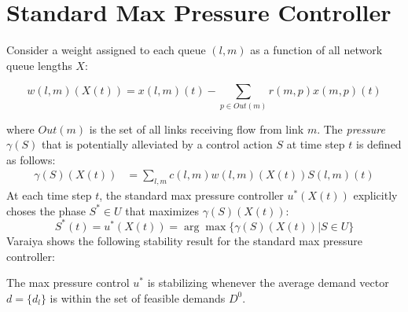 \section{Standard Max Pressure Controller} \label{sec:immediatefeedback}
Consider a weight assigned to each queue $(l,m)$ as a function of all network queue lengths $X$:
\begin{small}
\begin{equation} \label{linkweight}
w(l,m)(X(t))= x(l,m)(t) - \sum_{p \in Out(m)} r(m,p)x(m,p)(t)
\end{equation}
\end{small}
where $Out(m)$ is the set of all links receiving flow from link $m$. 
The \emph{pressure} $\gamma(S)$ that is potentially alleviated by a control action $S$ at time step $t$ is defined as follows: 
\begin{align}
\gamma(S)(X(t)) &= \sum_{l,m}c(l,m)w(l,m)(X(t))S(l,m)(t) 
\end{align}
At each time step $t$, the standard max pressure controller $u^{*}(X(t))$ explicitly choses the phase $S^*\in U$ that maximizes $\gamma(S)(X(t))$:
\begin{equation} \label{original_MP}
S^*(t)  = u^{*}(X(t)) = \arg\max\{\gamma(S)(X(t)) \vert S \in U\} 
\end{equation}
Varaiya \cite{MaxPressureStochastic} shows the following stability result for the standard max pressure controller:
\begin{Thm}\label{StabMP}
The max pressure control $u^{*}$ is stabilizing whenever the average demand vector $d = \lbrace d_{l}\rbrace$ is within the set of feasible demands $D^0$. 
\end{Thm}

